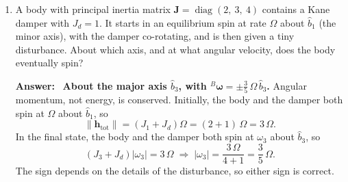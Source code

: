 \documentclass[11pt,letterpaper]{article}
\newenvironment{answer}{\par\vspace{4pt}\color{blue!60!black}\textbf{Answer:}\ }{\par\vspace{4pt}}
\begin{document}
\begin{enumerate}[label=\textbf{\arabic*.}, leftmargin=*, itemsep=4pt]
\item A body with principal inertia matrix $\mathbf{J} = \operatorname{diag}(2,\ 3,\ 4)$ contains a Kane damper with $J_d = 1$. It starts in an equilibrium spin at rate $\Omega$ about $\hat b_1$ (the minor axis), with the damper co-rotating, and is then given a tiny disturbance. About which axis, and at what angular velocity, does the body eventually spin?

\begin{answer}
\textbf{About the major axis $\hat b_3$, with ${}^{B}\boldsymbol{\omega} = \pm\tfrac{3}{5}\,\Omega\,\hat b_3$.} Angular momentum, not energy, is conserved. Initially, the body and the damper both spin at $\Omega$ about $\hat b_1$, so
\[
\lVert\mathbf{h}_{\text{tot}}\rVert = \left(J_1 + J_d\right)\Omega = (2 + 1)\,\Omega = 3\,\Omega .
\]
In the final state, the body and the damper both spin at $\omega_3$ about $\hat b_3$, so
\[
\left(J_3 + J_d\right)\lvert\omega_3\rvert = 3\,\Omega
\;\Longrightarrow\;
\lvert\omega_3\rvert = \frac{3\,\Omega}{4 + 1} = \frac{3}{5}\,\Omega .
\]
The sign depends on the details of the disturbance, so either sign is correct.
\end{answer}

\end{enumerate}
\end{document}
